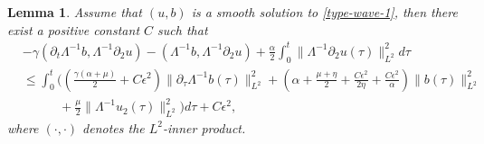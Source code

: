 \documentclass[reqno,11pt]{amsart}
\newtheorem{Lem}[Thm]{Lemma}
\numberwithin{Thm}{section}
\begin{document}
\begin{Lem}\label{LEM1}
Assume that $(u,b)$ is a smooth
 solution to \eqref{type-wave-1}, then there exist a positive constant $C$ such that
\begin{align}\label{FFF}
&-\gamma(\partial_t\Lambda^{-1}b,\Lambda^{-1}\partial_2u)-(\Lambda^{-1}b,\Lambda^{-1}\partial_2u)+\frac{\alpha}{2}\int_{0}^t\|\Lambda^{-1}\partial_2u(\tau)\|_{L^2}^2d\tau\nonumber\\
& \leq\int_{0}^t\Big((\frac{\gamma(\alpha+\mu)}{2}+C\epsilon^2)\|\partial_{\tau}\Lambda^{-1}b(\tau)\|_{L^2}^2+(\alpha+\frac{\mu+\eta}{2}+\frac{C\epsilon^2}{2\eta}+\frac{C\epsilon^2}{\alpha})\|b(\tau)\|_{L^2}^2
\nonumber\\
&\qquad \ \ \ \ +\frac{\mu}{2}\|\Lambda^{-1}u_2(\tau)\|_{L^2}^2\Big)d\tau+  C\epsilon^2,
\end{align}
where $(\cdot,\cdot)$ denotes the $L^2$-inner product.
\end{Lem}
\end{document}
